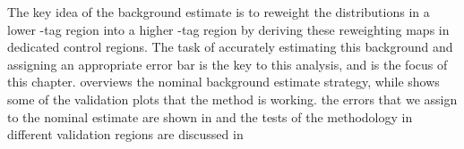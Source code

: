 The key idea of the background estimate is to reweight the distributions in a lower \Pqb-tag region into a higher \Pqb-tag region by deriving these reweighting maps in dedicated control regions. The task of accurately estimating this background and assigning an appropriate error bar is the key to this analysis, and is the focus of this chapter. \Sect{\ref{sec:rw-overview}} overviews the nominal background estimate strategy, while \Sect{\ref{sec:bkg-val-plots}} shows some of the validation plots that the method is working. the errors that we assign to the nominal estimate are shown in \Sect{\ref{sec:bkg-systs}} and the tests of the methodology in different validation regions are discussed in \Sect{\ref{sec:bkg-val-regns}}



\clearpage




\FloatBarrier
\clearpage




\FloatBarrier
\clearpage


